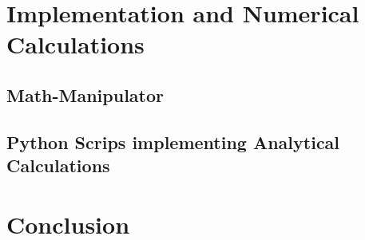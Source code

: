 \documentclass[
headings=optiontohead,              %
12pt,                               %
DIV=13,                             %
twoside=false,                      %
open=right,                         %
BCOR=00mm,                          %
toc=bibliographynumbered            %
]{scrreport}
\begin{document}
\chapter{Implementation and Numerical Calculations}
\label{sec:implementation-and-numerical}

\FloatBarrier

    \section{Math-Manipulator}
    \label{sec:implementation-math-manipulator}
    
    \FloatBarrier
        
        

    \section{Python Scrips implementing Analytical Calculations}
    \label{sec:implementation-analytical-calculations}
    
    \FloatBarrier
            
        

\chapter{Conclusion}
\label{sec:conclusion}

\FloatBarrier



\end{document}
